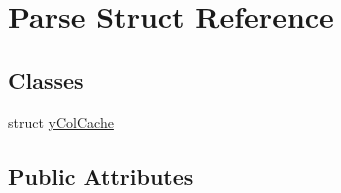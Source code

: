 \hypertarget{struct_parse}{\section{Parse Struct Reference}
\label{struct_parse}
}
\subsection*{Classes}
\begin{DoxyCompactItemize}
\item 
struct \hyperlink{struct_parse_1_1y_col_cache}{y\-Col\-Cache}
\end{DoxyCompactItemize}
\subsection*{Public Attributes}
